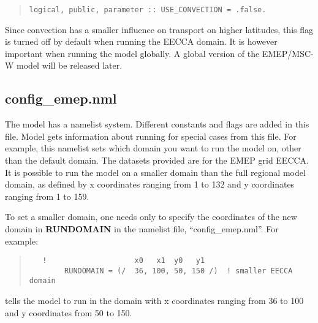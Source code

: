 \begin{small}
\begin{quote}
  \begin{verbatim}
logical, public, parameter :: USE_CONVECTION = .false. 
  \end{verbatim}
\end{quote}
\end{small}

Since convection has a smaller influence on transport on higher latitudes, 
this flag is turned off by default when running the EECCA domain. It is 
however important when running the model globally. A global version 
of the EMEP/MSC-W model will be released later. 


\subsection{config\_emep.nml}

The model has a namelist system.  Different constants and flags are added in 
this file.  Model gets information about running for special cases from this 
file.   For example, this namelist sets which domain you want to run the model 
on, other than the default domain. 
The datasets provided are for the EMEP grid EECCA. 
It is possible to run the model on a smaller domain than the full
regional model domain, as defined by  x coordinates ranging
from 1 to 132 and y coordinates ranging from 1 to 159. 

To set a smaller domain, one needs only to specify the
coordinates of the new domain in {\bf RUNDOMAIN} in the namelist file,  
 ``config\_emep.nml''. For example:

\begin{quote}
\begin{verbatim}
   !                    x0   x1  y0   y1
        RUNDOMAIN = (/  36, 100, 50, 150 /)  ! smaller EECCA domain
\end{verbatim}
\end{quote}

tells the model to run in the domain with x coordinates ranging from
36 to 100 and y coordinates from 50 to 150.\\ 


